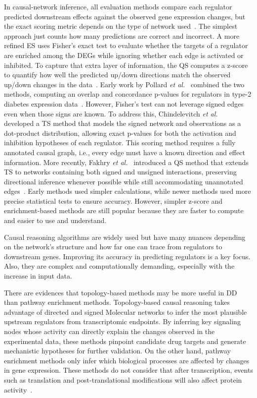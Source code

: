 In causal-network inference, all evaluation methods compare each regulator predicted downstream effects against the observed gene expression changes, but the exact scoring metric depends on the type of network used~\cite{RN81}. 
The simplest approach just counts how many predictions are correct and incorrect. 
A more refined \gls{ES} uses Fisher's exact test to evaluate whether the targets of a regulator are enriched among the \gls{DEGs} while ignoring whether each edge is activated or inhibited. 
To capture that extra layer of information, the \gls{QS} computes a z-score to quantify how well the predicted up/down directions match the observed up/down changes in the data~\cite{RN156}. 
Early work by Pollard \textit{et al.}~\cite{RN135} combined the two methods, computing an overlap and concordance p-values for regulators in type-2 diabetes expression data~\cite{RN156}.  
However, Fisher's test can not leverage signed edges even when those signs are known.
To address this, Chindelevitch \textit{et al.}~\cite{RN73, RN131} developed a \gls{TS} method that models the signed network and observations as a dot-product distribution, allowing exact p-values for both the activation and inhibition hypotheses of each regulator. 
This scoring method requires a fully annotated causal graph, i.e., every edge must have a known direction and effect information. 
More recently, Fakhry \textit{et al.}~\cite{RN158} introduced a \gls{QS} method that extends \gls{TS} to networks containing both signed and unsigned interactions, preserving directional inference whenever possible while still accommodating unannotated edges~\cite{RN81}. 
Early methods used simpler calculations, while newer methods used more precise statistical tests to ensure accuracy.
However, simpler z-score and enrichment-based methods are still popular because they are faster to compute and easier to use and understand. 

Causal reasoning algorithms are widely used but have many nuances depending on the network's structure and how far one can trace from regulators to downstream genes.
Improving its accuracy in predicting regulators is a key focus.
Also, they are complex and computationally demanding, especially with the increase in input data.

There are evidences that topology-based methods may be more useful in \gls{DD} than pathway enrichment methods.
Topology-based causal reasoning takes advantage of directed and signed \gls{Molecular network}s to infer the most plausible upstream regulators from transcriptomic endpoints.
By inferring key signaling nodes whose activity can directly explain the changes observed in the experimental data, these methods pinpoint candidate drug targets and generate mechanistic hypotheses for further validation. 
On the other hand, pathway enrichment methods only infer which biological processes are affected by changes in gene expression.
These methods do not consider that after transcription, events such as translation and post-translational modifications will also affect protein activity~\cite{RN53}.

